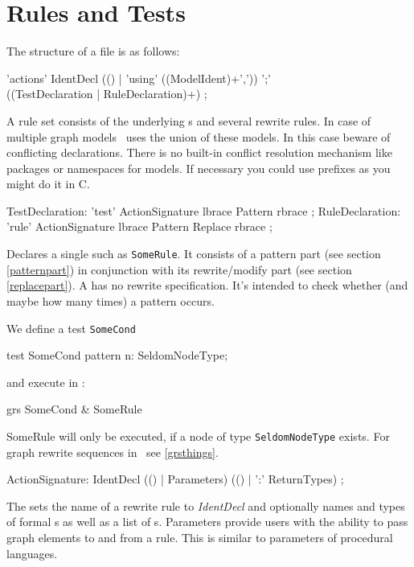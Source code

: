 \section{Rules and Tests}
\label{ruledecls}
The structure of a  file is as follows:
\begin{rail}
  'actions' IdentDecl (() | 'using' ((ModelIdent)+',')) ';' \\ ((TestDeclaration | RuleDeclaration)+) ;
\end{rail}
A rule set consists of the underlying s and several rewrite rules. In case of multiple graph models \GrG\ uses the union of these models. In this case beware of conflicting declarations. There is no built-in conflict resolution mechanism like packages or namespaces for models. If necessary you could use prefixes as you might do it in C.

\begin{rail}
  TestDeclaration: 'test' ActionSignature lbrace Pattern rbrace ;
  RuleDeclaration: 'rule' ActionSignature lbrace Pattern Replace rbrace ;
\end{rail}
Declares a single  such as \texttt{SomeRule}. It consists of a pattern part (see section \ref{patternpart}) in conjunction with its rewrite/modify part (see section \ref{replacepart}). A  has no rewrite specification. It's intended to check whether (and maybe how many times) a pattern occurs.
\begin{example}
We define a test \texttt{SomeCond}
\begin{grgen}
test SomeCond {
  pattern {
    n: SeldomNodeType;
  }
}
\end{grgen}
and execute in \GrShell:
\begin{grshell}
  grs SomeCond & SomeRule
\end{grshell}
SomeRule will only be executed, if a node of type \texttt{SeldomNodeType} exists. For graph rewrite sequences in \GrShell\ see \ref{grsthings}.
\end{example}

\begin{rail}  
  ActionSignature: IdentDecl (() | Parameters) (() | ':' ReturnTypes) ;
\end{rail}
The  sets the name of a rewrite rule to \emph{IdentDecl} and optionally names and types of formal s as well as a list of s. Parameters provide users with the ability to pass graph elements to and from a rule. This is similar to parameters of procedural languages.

